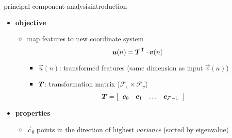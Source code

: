 

\begin{frame}{principal component analysis}{introduction}
				\begin{itemize}
						\item   \textbf{objective}
								\begin{itemize}
										\item   map features to new coordinate system
												\begin{equation*}\label{eq:pca_an}
														\vec{u}(n) = \mat{T}^\mathrm{T}\cdot\vec{v}(n) 
												\end{equation*}
												\begin{itemize}
														\item   $\vec{u}(n)$: transformed features (same dimension as input $\vec{v}(n)$)
														\item   $\mat{T}$: transformation matrix ($\mathcal{F}_v\times\mathcal{F}_v$)	
																\begin{equation*}
																		\mat{T} =   \left[ 
																										\begin{array}{cccc}
																										\vec{c}_0 & \vec{c}_1 & \ldots & \vec{c}_{\mathcal{F}-1}\\
																										\end{array}  
																								\right] 
																\end{equation*}
												\end{itemize}
								\end{itemize}
						\item<2->   \textbf{properties}
								\begin{itemize}
										\item	$\vec{c}_0$ points in the direction of  highest \emph{variance} (sorted by eigenvalue)

\end{itemize}
\end{itemize}
\end{frame}
